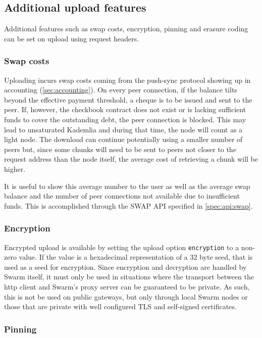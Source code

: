 \subsection{Additional upload features \statusgreen}\label{sec:features}

Additional features such as swap costs, encryption, pinning and erasure coding can be set on upload using request headers. 


\subsubsection{Swap costs}

Uploading incurs swap costs coming from the push-sync protocol showing up in  accounting (\ref{sec:accounting}). On every peer connection, if the balance tilts beyond the effective payment threshold, a cheque is to be issued and sent to the peer. If, however, the checkbook contract does not exist or is lacking sufficient funds to cover the outstanding debt, the peer connection is blocked. This may lead to unsaturated Kademlia and during that time, the node will count as a light node. The download can continue potentially using a smaller number of peers but, since some chunks will need to be sent to peers not closer to the request address than the node itself, the average cost of retrieving a chunk will be higher. 

It is useful to show this average number to the user as well as the average swap balance and the number of peer connections not available due to insufficient funds. This is accomplished through the SWAP API specified in \ref{spec:api:swap}.

\subsubsection{Encryption}

Encrypted upload is available by setting the upload option \lstinline{encryption} to a non-zero value. If the value is a hexadecimal representation of a 32 byte seed, that is used as a seed for encryption. Since encryption and decryption are handled by Swarm itself, it must only be used in situations where the transport between the http client and Swarm's proxy server can be guaranteed to be private. As such, this is not be used on public gateways, but only through local Swarm nodes or those that are private with well configured TLS and self-signed certificates.

\subsubsection{Pinning}


